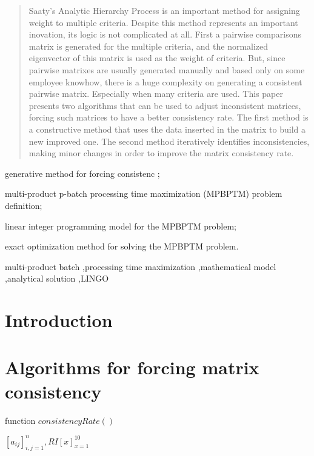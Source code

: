 \documentclass[authoryear,manuscript,12pt]{elsarticle}
\begin{document}
\begin{frontmatter}
\begin{abstract} 
Saaty's Analytic Hierarchy Process is an important method for assigning weight to multiple criteria. Despite this method represents an important inovation, its logic is not complicated at all. First a pairwise comparisons matrix is generated for the multiple criteria, and the normalized eigenvector of this matrix is used as the weight of criteria. But, since pairwise matrixes are usually generated manually and based only on some employee knowhow, there is a huge complexity on generating a consistent pairwise matrix. Especially when many criteria are used. This paper presents two algorithms that can be used to adjust inconsistent matrices, forcing such matrices to have a better consistency rate. The first method is a constructive method that uses the data inserted in the matrix to build a new improved one. The second method iteratively identifies inconsistencies, making minor changes in order to improve the matrix consistency rate. 
\end{abstract}

\begin{highlights}
\item generative method for forcing consistenc ;
\item multi-product p-batch processing time maximization (MPBPTM) problem definition;
\item linear integer programming model for the MPBPTM problem;
\item exact optimization method for solving the MPBPTM problem.
\end{highlights}

\begin{keyword}
multi-product batch \sep processing time maximization \sep mathematical model \sep analytical solution \sep LINGO
\end{keyword}
\end{frontmatter}


\section{Introduction}
\label{sec:intro}

\section{Algorithms for forcing matrix consistency}
\begin{algorithm}
\caption{function $consistencyRate()$}\label{alg:CA}
\begin{algorithmic}
\Require $[a_{ij}]_{i,j=1}^{n}, RI[x]_{x=1}^{10}$
\end{algorithmic}
\end{algorithm}
\end{document}
